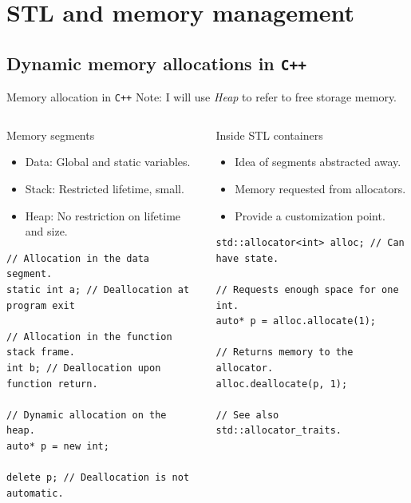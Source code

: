 \documentclass[10pt,aspectratio=169]{beamer}
\begin{document}
\section{STL and memory management}

\subsection{Dynamic memory allocations in \texttt{C++}}

\begin{frame}[fragile]{Memory allocation in \texttt{C++}}
{Note: I will use {\it Heap} to refer to free storage memory.}
\begin{columns}
\begin{column}[t]{0.45\textwidth}
\begin{block}{Memory segments}
\begin{itemize}
\item Data: Global and static variables.
\item Stack: Restricted lifetime, small.
\item Heap: No restriction on lifetime and size.
\end{itemize}
\end{block}
\begin{lstlisting}
// Allocation in the data segment.
static int a; // Deallocation at program exit

// Allocation in the function stack frame.
int b; // Deallocation upon function return.

// Dynamic allocation on the heap.
auto* p = new int;

delete p; // Deallocation is not automatic.
\end{lstlisting}
\end{column}

\begin{column}[t]{0.45\textwidth}
\begin{block}{Inside STL containers}
\begin{itemize}
\item Idea of segments abstracted away.
\item Memory requested from allocators.
\item Provide a customization point.
\end{itemize}
\end{block}
\begin{lstlisting}
std::allocator<int> alloc; // Can have state.

// Requests enough space for one int.
auto* p = alloc.allocate(1);

// Returns memory to the allocator.
alloc.deallocate(p, 1);

// See also std::allocator_traits.
\end{lstlisting}
\end{column}
\end{columns}
\end{frame}
\end{document}
